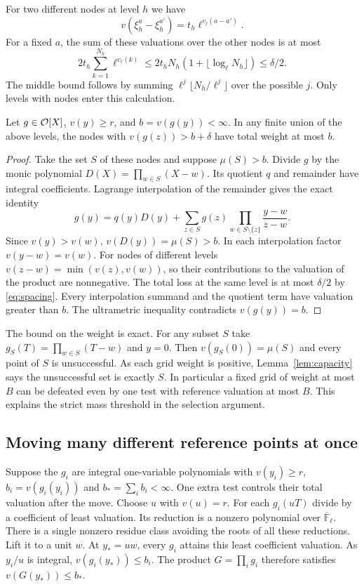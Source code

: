 For two different nodes at level $h$ we have
\[
 v(\xi_h^a-\xi_h^{a'})=t_h\ell^{v_\ell(a-a')}.
\]
For a fixed $a$, the sum of these valuations over the other nodes is at most
\begin{equation}
 2t_h\sum_{k=1}^{N_h}\ell^{v_\ell(k)}
 \le 2t_hN_h(1+\lfloor\log_\ell N_h\rfloor)
 \le\delta/2. \label{eq:spacing}
\end{equation}
The middle bound follows by summing $\ell^j\lfloor N_h/\ell^j\rfloor$ over the possible $j$. Only levels with nodes enter this calculation.

\begin{lemma}\label{lem:capacity}
Let $g\in\mathcal O[X]$, $v(y)\ge r$, and $b=v(g(y))<\infty$. In any finite union of the above levels, the nodes with $v(g(z))>b+\delta$ have total weight at most $b$.
\end{lemma}
\begin{proof}
Take the set $S$ of these nodes and suppose $\mu(S)>b$. Divide $g$ by the monic polynomial $D(X)=\prod_{w\in S}(X-w)$. Its quotient $q$ and remainder have integral coefficients. Lagrange interpolation of the remainder gives the exact identity
\[
 g(y)=q(y)D(y)+\sum_{z\in S}g(z)
            \prod_{w\in S\setminus\{z\}}\frac{y-w}{z-w}.
\]
Since $v(y)>v(w)$, $v(D(y))=\mu(S)>b$. In each interpolation factor $v(y-w)=v(w)$. For nodes of different levels $v(z-w)=\min(v(z),v(w))$, so their contributions to the valuation of the product are nonnegative. The total loss at the same level is at most $\delta/2$ by \eqref{eq:spacing}. Every interpolation summand and the quotient term have valuation greater than $b$. The ultrametric inequality contradicts $v(g(y))=b$.
\end{proof}

The bound on the weight is exact. For any subset $S$ take $g_S(T)=\prod_{w\in S}(T-w)$ and $y=0$. Then $v(g_S(0))=\mu(S)$ and every point of $S$ is unsuccessful. As each grid weight is positive, Lemma~\ref{lem:capacity} says the unsuccessful set is exactly $S$. In particular a fixed grid of weight at most $B$ can be defeated even by one test with reference valuation at most $B$. This explains the strict mass threshold in the selection argument.

\subsection*{Moving many different reference points at once}
Suppose the $g_i$ are integral one-variable polynomials with $v(y_i)\ge r$, $b_i=v(g_i(y_i))$ and $b_*=\sum_i b_i<\infty$. One extra test controls their total valuation after the move. Choose $u$ with $v(u)=r$. For each $g_i(uT)$ divide by a coefficient of least valuation. Its reduction is a nonzero polynomial over $\overline{\mathbb F}_\ell$. There is a single nonzero residue class avoiding the roots of all these reductions. Lift it to a unit $w$. At $y_*=uw$, every $g_i$ attains this least coefficient valuation. As $y_i/u$ is integral, $v(g_i(y_*))\le b_i$. The product $G=\prod_i g_i$ therefore satisfies $v(G(y_*))\le b_*$.

